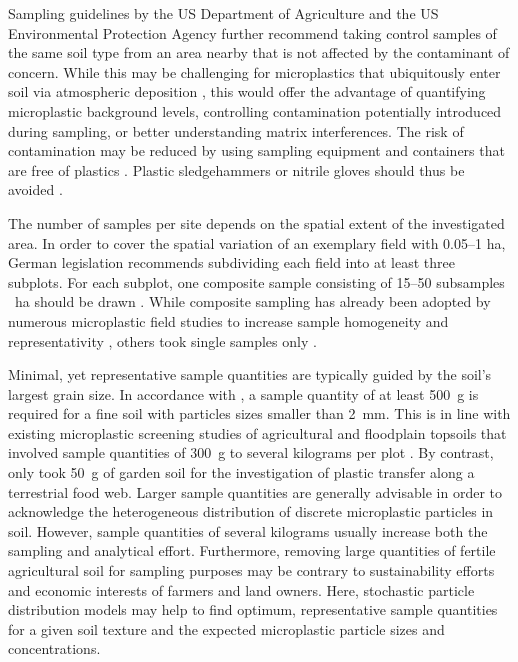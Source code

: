 Sampling guidelines by the US Department of Agriculture \citep{SchoenebergerField2012} and the US Environmental Protection Agency \citep{USEPALSASD2020} further recommend taking control samples of the same soil type from an area nearby that is not affected by the contaminant of concern. While this may be challenging for microplastics that ubiquitously enter soil via atmospheric deposition \citep{BergmannWhite2019}, this would offer the advantage of quantifying microplastic background levels, controlling contamination potentially introduced during sampling, or better understanding matrix interferences.
The risk of contamination may be reduced by using sampling equipment and containers that are free of plastics \citep{PiehlIdentification2018,ScheurerMicroplastics2018}. Plastic sledgehammers or nitrile gloves should thus be avoided \citep{WitzigWhen2020}.

The number of samples per site depends on the spatial extent of the investigated area. In order to cover the spatial variation of an exemplary field with 0.05--1 ha, German legislation \citep{BBodSchVFederal1999} recommends subdividing each field into at least three subplots.
For each subplot, one composite sample consisting of \numrange{15}{50} subsamples \si{\per\hectare} should be drawn \citep{ISO18400-102Soil2017}. While composite sampling has already been adopted by numerous microplastic field studies to increase sample homogeneity and representativity \citep{RamosPolyethylene2015,HuertaLwangaField2017,ScheurerMicroplastics2018}, others took single samples only \citep{PiehlIdentification2018,LiuMicroplastic2018,CorradiniEvidence2019}.

Minimal, yet representative sample quantities are typically guided by the soil's largest grain size. In accordance with \citet{ISO17892-4Geotechnical2016,ISO18400-102Soil2017}, a sample quantity of at least \SI{500}{\gram} is required for a fine soil with particles sizes smaller than \SI{2}{\milli\meter}. This is in line with existing microplastic screening studies of agricultural and floodplain topsoils that involved sample quantities of \SI{300}{\gram} to several kilograms per plot \citep{ScheurerMicroplastics2018,LiuMicroplastic2018,PiehlIdentification2018}.
By contrast, \citet{HuertaLwangaField2017} only took \SI{50}{\gram} of garden soil for the investigation of plastic transfer along a terrestrial food web. Larger sample quantities are generally advisable in order to acknowledge the heterogeneous distribution of discrete microplastic particles in soil. However, sample quantities of several kilograms usually increase both the sampling and analytical effort.
Furthermore, removing large quantities of fertile agricultural soil for sampling purposes may be contrary to sustainability efforts and economic interests of farmers and land owners. Here, stochastic particle distribution models \citep{HammersleyStochastic1972} may help to find optimum, representative sample quantities for a given soil texture and the expected microplastic particle sizes and concentrations.


